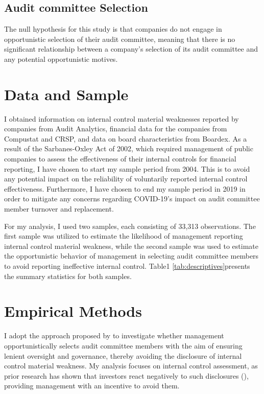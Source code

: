 \documentclass[12pt,english]{article}
\begin{document}
\subsection{Audit committee Selection}

The null hypothesis for this study is that companies do not engage in opportunistic selection of their audit committee, meaning that there is no significant relationship between a company's selection of its audit committee and any potential opportunistic motives.


\section{Data and Sample}\label{sec:data}
I obtained information on internal control material weaknesses reported by companies from Audit Analytics, financial data for the companies from Compustat and CRSP, and data on board characteristics from Boardex. As a result of the Sarbanes-Oxley Act of 2002, which required management of public companies to assess the effectiveness of their internal controls for financial reporting, I have chosen to start my sample period from 2004. This is to avoid any potential impact on the reliability of voluntarily reported internal control effectiveness. Furthermore, I have chosen to end my sample period in 2019 in order to mitigate any concerns regarding COVID-19's impact on audit committee member turnover and replacement.

For my analysis, I used two samples, each consisting of 33,313 observations. The first sample was utilized to estimate the likelihood of management reporting internal control material weakness, while the second sample was used to estimate the opportunistic behavior of management in selecting audit committee members to avoid reporting ineffective internal control. Table1 \ref{tab:descriptives}presents the summary statistics for both samples.


\section{Empirical Methods}\label{sec:methods}
I adopt the approach proposed by \citet{lennox2000} to investigate whether management opportunistically selects audit committee members with the aim of ensuring lenient oversight and governance, thereby avoiding the disclosure of internal control material weakness. My analysis focuses on internal control assessment, as prior research has shown that investors react negatively to such disclosures (\citet{hm2008}), providing management with an incentive to avoid them.
\end{document}
